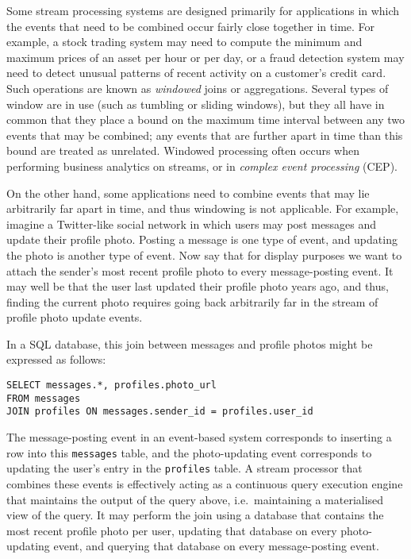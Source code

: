 \documentclass[sigconf,nonacm]{acmart}
\begin{document}
Some stream processing systems are designed primarily for applications in which the events that need to be combined occur fairly close together in time.
For example, a stock trading system may need to compute the minimum and maximum prices of an asset per hour or per day, or a fraud detection system may need to detect unusual patterns of recent activity on a customer's credit card.
Such operations are known as \emph{windowed} joins or aggregations.
Several types of window are in use (such as tumbling or sliding windows), but they all have in common that they place a bound on the maximum time interval between any two events that may be combined; any events that are further apart in time than this bound are treated as unrelated.
Windowed processing often occurs when performing business analytics on streams, or in \emph{complex event processing} (CEP).

On the other hand, some applications need to combine events that may lie arbitrarily far apart in time, and thus windowing is not applicable.
For example, imagine a Twitter-like social network in which users may post messages and update their profile photo.
Posting a message is one type of event, and updating the photo is another type of event.
Now say that for display purposes we want to attach the sender's most recent profile photo to every message-posting event.
It may well be that the user last updated their profile photo years ago, and thus, finding the current photo requires going back arbitrarily far in the stream of profile photo update events.

In a SQL database, this join between messages and profile photos might be expressed as follows:

\begin{verbatim}
SELECT messages.*, profiles.photo_url
FROM messages
JOIN profiles ON messages.sender_id = profiles.user_id
\end{verbatim}

The message-posting event in an event-based system corresponds to inserting a row into this \texttt{messages} table, and the photo-updating event corresponds to updating the user's entry in the \texttt{profiles} table.
A stream processor that combines these events is effectively acting as a continuous query execution engine that maintains the output of the query above, i.e.\ maintaining a materialised view of the query.
It may perform the join using a database that contains the most recent profile photo per user, updating that database on every photo-updating event, and querying that database on every message-posting event.
\end{document}
